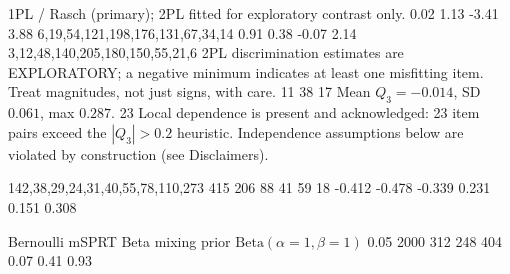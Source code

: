          {1PL / Rasch (primary); 2PL fitted for exploratory
                           contrast only.}
     {0.02}
       {1.13}
      {-3.41}
      {3.88}
     {6,19,54,121,198,176,131,67,34,14}
     {0.91}
       {0.38}
      {-0.07}
      {2.14}
     {3,12,48,140,205,180,150,55,21,6}
   {2PL discrimination estimates are EXPLORATORY; a
                           negative minimum indicates at least one misfitting
                           item. Treat magnitudes, not just signs, with care.}
   {11}
    {38}
 {17}
        {Mean $Q_3 = -0.014$, SD $0.061$, max $0.287$.}
      {23}
           {Local dependence is present and acknowledged:
                           23 item pairs exceed the $|Q_3|>0.2$ heuristic.
                           Independence assumptions below are violated by
                           construction (see Disclaimers).}

         {142,38,29,24,31,40,55,78,110,273}
       {415}
    {206}
         {88}
          {41}
        {59}
         {18}
 {-0.412}
  {-0.478}
  {-0.339}
 {0.231}
  {0.151}
  {0.308}

      {}
      {}
           {}
     {}
    {}
      {}
      {}
       {}
   {}

       {Bernoulli mSPRT}
         {Beta mixing prior $\mathrm{Beta}(\alpha{=}1,\beta{=}1)$}
        {0.05}
        {2000}
  {312}
       {248}
       {404}
      {0.07}
    {0.41}
    {0.93}

